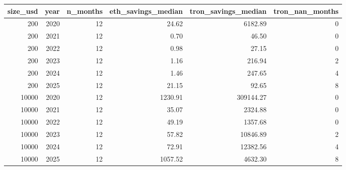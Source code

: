 \begin{tabular}{rrrrrr}
\toprule
size_usd & year & n_months & eth_savings_median & tron_savings_median & tron_nan_months \\
\midrule
200 & 2020 & 12 & 24.62 & 6182.89 & 0 \\
200 & 2021 & 12 & 0.70 & 46.50 & 0 \\
200 & 2022 & 12 & 0.98 & 27.15 & 0 \\
200 & 2023 & 12 & 1.16 & 216.94 & 2 \\
200 & 2024 & 12 & 1.46 & 247.65 & 4 \\
200 & 2025 & 12 & 21.15 & 92.65 & 8 \\
10000 & 2020 & 12 & 1230.91 & 309144.27 & 0 \\
10000 & 2021 & 12 & 35.07 & 2324.88 & 0 \\
10000 & 2022 & 12 & 49.19 & 1357.68 & 0 \\
10000 & 2023 & 12 & 57.82 & 10846.89 & 2 \\
10000 & 2024 & 12 & 72.91 & 12382.56 & 4 \\
10000 & 2025 & 12 & 1057.52 & 4632.30 & 8 \\
\bottomrule
\end{tabular}
